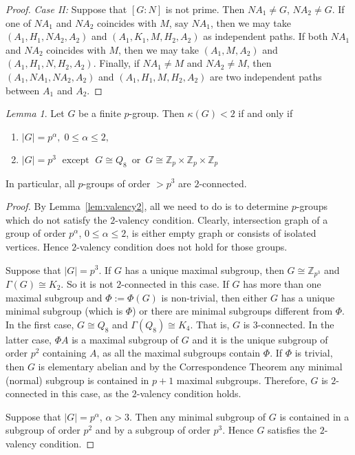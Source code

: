 \documentclass[a4paper,12pt]{article}
\theoremstyle{definition}
\theoremstyle{remark}
\theoremstyle{theorem}
\newtheorem{lem}[theorem]{Lemma}
\begin{document}
\begin{proof}
  \emph{Case II:} Suppose that $[G:N]$ is not prime. Then
  $NA_1\neq G$, $NA_2\neq G$. If one of $NA_1$ and $NA_2$ coincides
  with $M$, say $NA_1$, then we may take $(A_1,H_1,NA_2,A_2)$ and
  $(A_1,K_1,M,H_2,A_2)$ as independent paths. If both $NA_1$ and
  $NA_2$ coincides with $M$, then we may take $(A_1,M,A_2)$ and
  $(A_1,H_1,N,H_2,A_2)$. Finally, if $NA_1\neq M$ and $NA_2\neq M$,
  then $(A_1,NA_1,NA_2,A_2)$ and $(A_1,H_1,M,H_2,A_2)$ are two
  independent paths between $A_1$ and $A_2$.
\end{proof}

\begin{lem}\label{lem:pgroup2}
  Let $G$ be a finite $p$-group. Then $\kappa(G)<2$ if and only if
  \begin{enumerate}
  \item $|G|=p^{\alpha}, \; 0\leq\alpha\leq 2,$
  \item
    $|G|=p^3\; \text{ except }\; G\cong Q_8\, \text{ or }\, G\cong
    \mathbb{Z}_p\times\mathbb{Z}_p\times\mathbb{Z}_p$
  \end{enumerate}
  In particular, all $p$-groups of order $>p^3$ are $2$-connected.
\end{lem}


\begin{proof}
  By Lemma~\ref{lem:valency2}, all we need to do is to determine
  $p$-groups which do not satisfy the $2$-valency condition. Clearly,
  intersection graph of a group of order $p^{\alpha}$,
  $0\leq \alpha \leq 2$, is either empty graph or consists of isolated
  vertices. Hence $2$-valency condition does not hold for those
  groups.

  Suppose that $|G|=p^3$. If $G$ has a unique maximal subgroup, then
  $G\cong\mathbb{Z}_{p^3}$ and $\Gamma(G)\cong K_2$. So it is not
  $2$-connected in this case. If $G$ has more than one maximal
  subgroup and $\Phi:=\Phi(G)$ is non-trivial, then either $G$ has a
  unique minimal subgroup (which is $\Phi$) or there are minimal
  subgroups different from $\Phi$. In the first case, $G\cong Q_8$ and
  $\Gamma(Q_8)\cong K_4$. That is, $G$ is $3$-connected. In the latter
  case, $\Phi A$ is a maximal subgroup of $G$ and it is the unique
  subgroup of order $p^2$ containing $A$, as all the maximal subgroups
  contain $\Phi$. If $\Phi$ is trivial, then $G$ is elementary abelian
  and by the Correspondence Theorem any minimal (normal) subgroup is
  contained in $p+1$ maximal subgroups. Therefore, $G$ is $2$-connected in
  this case, as the $2$-valency condition holds.

  Suppose that $|G|=p^{\alpha}$, $\alpha>3$. Then any minimal subgroup
  of $G$ is contained in a subgroup of order $p^2$ and by a subgroup
  of order $p^3$. Hence $G$ satisfies the $2$-valency condition.
\end{proof}
\end{document}
